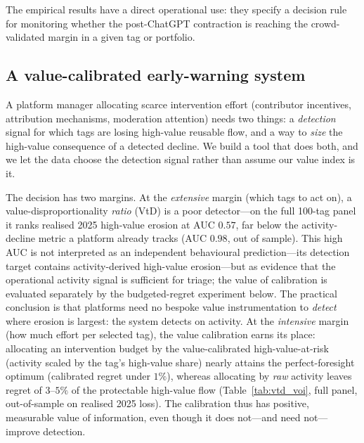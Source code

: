 \label{sec:policy_body}

The empirical results have a direct operational use: they
specify a decision rule for monitoring whether the post-ChatGPT
contraction is reaching the crowd-validated margin in a given
tag or portfolio.

\subsection{A value-calibrated early-warning system}
\label{ssec:pol_monitor}

A platform manager allocating scarce intervention effort
(contributor incentives, attribution mechanisms, moderation
attention) needs two things: a \emph{detection} signal for which
tags are losing high-value reusable flow, and a way to
\emph{size} the high-value consequence of a detected decline. We
build a tool that does both, and we let the data choose the
detection signal rather than assume our value index is it.

The decision has two margins. At the \emph{extensive} margin
(which tags to act on), a value-disproportionality \emph{ratio}
(VtD) is a poor detector---on the full 100-tag panel it ranks
realised 2025 high-value erosion at AUC $0.57$, far below the
activity-decline metric a platform already tracks (AUC $0.98$,
out of sample). This high AUC is not interpreted as an
independent behavioural prediction---its detection target contains
activity-derived high-value erosion---but as evidence that the
operational activity signal is sufficient for triage; the value of
calibration is evaluated separately by the budgeted-regret
experiment below. The practical conclusion is that platforms need
no bespoke value instrumentation to \emph{detect} where erosion is
largest: the system detects on activity. At the \emph{intensive}
margin (how much effort per selected tag), the value calibration
earns its place: allocating an intervention budget by the
value-calibrated high-value-at-risk (activity scaled by the
tag's high-value share) nearly attains the perfect-foresight
optimum (calibrated regret under $1\%$), whereas allocating by \emph{raw}
activity leaves regret of $3$--$5\%$ of the protectable
high-value flow (Table~\ref{tab:vtd_voi}, full panel,
out-of-sample on realised 2025 loss). The calibration thus has
positive, measurable value of information, even though it does
not---and need not---improve detection.

